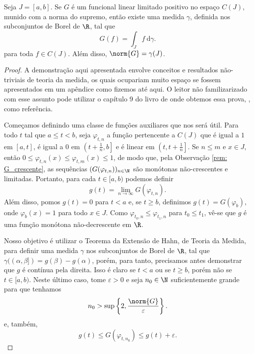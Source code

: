 \begin{teo}
    Seja \( J = [a, b] \).
    Se \( G \) é um funcional linear limitado positivo no espaço \( C(J) \), munido com a norma do supremo, então existe uma medida \( \gamma \), definida nos subconjuntos de Borel de \( \R \), tal que
    \begin{equation}
        G(f) = \int_{ J } f \ \mathrm{d}\gamma
        \label{eq: representation}
    .\end{equation}
    para toda \( f \in C(J) \).
    Além disso, \( \norm{ G } = \gamma(J) \).
\end{teo}
\begin{proof}
    A demonstração aqui apresentada envolve conceitos e resultados não-triviais de teoria da medida, os quais ocupariam muito espaço se fossem apresentados em um apêndice como fizemos até aqui.
    O leitor não familizarizado com esse assunto pode utilizar o capítulo 9 do livro de onde obtemos essa prova, \cite{bartle}, como referência.

    Começamos definindo uma classe de funções auxiliares que nos será útil.
    Para todo \( t \) tal que \( a \leq t < b \), seja \( \varphi_{ t,n } \) a função pertencente a \( C(J) \) que é igual a \( 1 \) em \( [a, t] \), é igual a \( 0 \) em \( \left(t+ \frac{ 1 }{ n }, b\right] \) e é linear em \( \left(t, t + \frac{ 1 }{ n }\right] \).
    Se \( n \leq m \) e \( x \in J \), então \( 0 \leq \varphi_{ t, n }(x) \leq \varphi_{ t, m }(x) \leq 1 \), de modo que, pela Observação \ref{rem: G_crescente}, as sequências \( (G(\varphi_{ t, n }))_{ n\in\N } \) são monótonas não-crescentes e limitadas.
    Portanto, para cada \( t \in [a, b) \) podemos definir \[
        g(t) = \lim_{ n\to\infty } G(\varphi_{ t,n })
    .\]
    Além disso, pomos \( g(t) = 0 \) para \( t < a \) e, se \( t \geq b \), definimos \( g(t) = G(\varphi_{ b }) \), onde \( \varphi_{ b }(x) = 1 \) para todo \( x \in J \).
    Como \( \varphi_{ t_{ 0 }, n } \leq \varphi_{ t_{ 1 }, n } \) para \( t_{ 0 } \leq t_{ 1 } \), vê-se que \( g \) é uma função monótona não-decrescente em \( \R \).

    Nosso objetivo é utilizar o Teorema da Extensão de Hahn, de Teoria da Medida, para definir uma medida \( \gamma \) nos subconjuntos de Borel de \( \R \), tal que \( \gamma((\alpha, \beta]) = g(\beta) - g(\alpha) \), porém, para tanto, precisamos antes demonstrar que \( g \) é contínua pela direita.
    Isso é claro se \( t < a \) ou se \( t \geq b \), porém não se \( t \in [a, b) \).
    Neste último caso, tome \( \varepsilon > 0 \) e seja \( n_{ 0 } \in \N \) suficientemente grande para que tenhamos
    \begin{equation}
        n_{ 0 } > \sup \left\{ 2, \frac{ \norm{ G } }{ \varepsilon } \right\}
        \label{eq: n0}
    .\end{equation}
    e, também,
    \begin{equation}
        g(t) \leq G(\varphi_{ t, n_{ 0 } }) \leq g(t) + \varepsilon
        \label{eq: g_sandwich}
    .\end{equation}


\end{proof}
